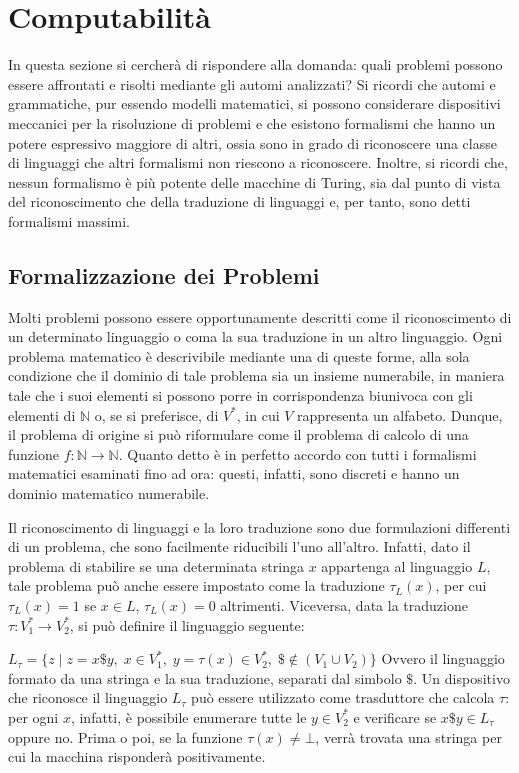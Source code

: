 \chapter{Computabilità}
  In questa sezione si cercherà di rispondere alla domanda: quali problemi possono essere affrontati e risolti mediante gli automi analizzati?
  Si ricordi che automi e grammatiche, pur essendo modelli matematici, si possono considerare dispositivi meccanici per la risoluzione di problemi e che esistono formalismi che hanno un potere espressivo maggiore di altri, ossia sono in grado di riconoscere una classe di linguaggi che altri formalismi non riescono a riconoscere. Inoltre, si ricordi che, nessun formalismo è più potente delle macchine di Turing, sia dal punto di vista del riconoscimento che della traduzione di linguaggi e, per tanto, sono detti formalismi massimi.

  \section{Formalizzazione dei Problemi}
  Molti problemi possono essere opportunamente descritti come il riconoscimento di un determinato linguaggio o coma la sua traduzione in un altro linguaggio. Ogni problema matematico è descrivibile mediante una di queste forme, alla sola condizione che il dominio di tale problema sia un insieme numerabile, in maniera tale che i suoi elementi si possono porre in corrispondenza biunivoca con gli elementi di \(\mathbb N\) o, se si preferisce, di \(V^*\), in cui \(V\) rappresenta un alfabeto. Dunque, il problema di origine si può riformulare come il problema di calcolo di una funzione \(f:\mathbb N\to\mathbb N\). Quanto detto è in perfetto accordo con tutti i formalismi matematici esaminati fino ad ora: questi, infatti, sono discreti e hanno un dominio matematico numerabile.

  Il riconoscimento di linguaggi e la loro traduzione sono due formulazioni differenti di un problema, che sono facilmente riducibili l'uno all'altro. Infatti, dato il problema di stabilire se una determinata stringa \(x\) appartenga al linguaggio \(L\), tale problema può anche essere impostato come la traduzione \(\tau_L(x)\), per cui \(\tau_L(x) = 1\) se \(x\in L\), \(\tau_L(x)=0\) altrimenti. Viceversa, data la traduzione \(\tau:V_1^*\to V_2^*\), si può definire il linguaggio seguente:
  
  \(L_{\tau}=\{z\;|\;z=x\$y,\; x\in V_1^*,\; y=\tau(x)\in V_2^*,\; \$ \notin (V_1\cup V_2)\} \)
  Ovvero il linguaggio formato da una stringa e la sua traduzione, separati dal simbolo \(\$\). Un dispositivo che riconosce il linguaggio \(L_{\tau}\) può essere utilizzato come trasduttore che calcola \(\tau\): per ogni \(x\), infatti, è possibile enumerare tutte le \(y\in V_2^*\) e verificare se \(x\$y\in L_{\tau}\) oppure no. Prima o poi, se la funzione \(\tau(x)\neq \bot \), verrà trovata una stringa per cui la macchina risponderà positivamente.


